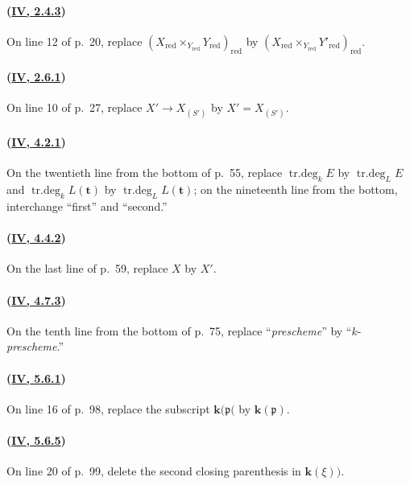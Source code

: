 \paragraph{({\texorpdfstring{\protect\hyperref[IV.2.4.3]{\textbf{IV}, 2.4.3}}{IV, 2.4.3}})}
On line 12 of p.~20, replace
$(X_{\mathrm{red}}\times_{Y_{\mathrm{red}}}Y_{\mathrm{red}})_{\mathrm{red}}$
by
$(X_{\mathrm{red}}\times_{Y_{\mathrm{red}}}Y'_{\mathrm{red}})_{\mathrm{red}}$.

\paragraph{({\texorpdfstring{\protect\hyperref[IV.2.6.1]{\textbf{IV}, 2.6.1}}{IV, 2.6.1}})}
On line 10 of p.~27, replace $X'\to X_{(S')}$ by $X'=X_{(S')}$.

\paragraph{({\texorpdfstring{\protect\hyperref[IV.4.2.1]{\textbf{IV}, 4.2.1}}{IV, 4.2.1}})}
On the twentieth line from the bottom of p.~55, replace
$\operatorname{tr.deg}_kE$ by $\operatorname{tr.deg}_LE$ and
$\operatorname{tr.deg}_kL(\mathbf{t})$ by $\operatorname{tr.deg}_LL(\mathbf{t})$; on the
nineteenth line from the bottom, interchange ``first'' and ``second.''

\paragraph{({\texorpdfstring{\protect\hyperref[IV.4.4.2]{\textbf{IV}, 4.4.2}}{IV, 4.4.2}})}
On the last line of p.~59, replace $X$ by $X'$.

\paragraph{({\texorpdfstring{\protect\hyperref[IV.4.7.3]{\textbf{IV}, 4.7.3}}{IV, 4.7.3}})}
On the tenth line from the bottom of p.~75, replace ``\emph{prescheme}'' by
``$k$-\emph{prescheme}.''

\paragraph{({\texorpdfstring{\protect\hyperref[IV.5.6.1]{\textbf{IV}, 5.6.1}}{IV, 5.6.1}})}
On line 16 of p.~98, replace the subscript $\boldsymbol{k}(\mathfrak p($ by
$\boldsymbol{k}(\mathfrak p)$.

\paragraph{({\texorpdfstring{\protect\hyperref[IV.5.6.5]{\textbf{IV}, 5.6.5}}{IV, 5.6.5}})}
On line 20 of p.~99, delete the second closing parenthesis in $\boldsymbol{k}(\xi))$.

